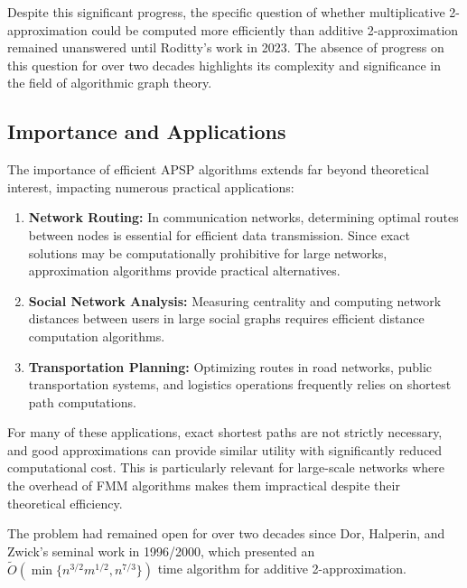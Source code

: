 \documentclass[a4paper,11pt,oneside]{book}
\begin{document}
Despite this significant progress, the specific question of whether multiplicative 2-approximation could be computed more efficiently than additive 2-approximation remained unanswered until Roditty's work in 2023. The absence of progress on this question for over two decades highlights its complexity and significance in the field of algorithmic graph theory.\\

\subsection{Importance and Applications}
The importance of efficient APSP algorithms extends far beyond theoretical interest, impacting numerous practical applications:

\begin{enumerate}
    \item \textbf{Network Routing:} In communication networks, determining optimal routes between nodes is essential for efficient data transmission. Since exact solutions may be computationally prohibitive for large networks, approximation algorithms provide practical alternatives.
    
    \item \textbf{Social Network Analysis:} Measuring centrality and computing network distances between users in large social graphs requires efficient distance computation algorithms.
    
    \item \textbf{Transportation Planning:} Optimizing routes in road networks, public transportation systems, and logistics operations frequently relies on shortest path computations.
    
\end{enumerate}
For many of these applications, exact shortest paths are not strictly necessary, and good approximations can provide similar utility with significantly reduced computational cost. This is particularly relevant for large-scale networks where the overhead of FMM algorithms makes them impractical despite their theoretical efficiency.

The problem had remained open for over two decades since Dor, Halperin, and Zwick's seminal work in 1996/2000, which presented an $\tilde{O}(\min\{n^{3/2}m^{1/2}, n^{7/3}\})$ time algorithm for additive 2-approximation.
\end{document}
